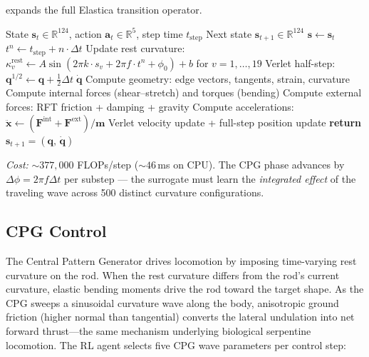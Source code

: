 \documentclass[11pt]{article}
\begin{document}
 expands the full Elastica transition operator.

\begin{algorithm}[ht!]\small
\caption{Elastica Transition Operator $T(\mathbf{s}_t,\, \mathbf{a}_t,\, t_{\text{step}}) \to \mathbf{s}_{t+1}$}\label{alg:elastica-transition}
\begin{algorithmic}[1]
\Require State $\mathbf{s}_t \in \mathbb{R}^{124}$, action $\mathbf{a}_t \in \mathbb{R}^5$, step time $t_{\text{step}}$
\Ensure Next state $\mathbf{s}_{t+1} \in \mathbb{R}^{124}$
\State $\mathbf{s} \gets \mathbf{s}_t$
  \State $t^n \gets t_{\text{step}} + n \cdot \Delta t$
  \State Update rest curvature: $\kappa_v^{\text{rest}} \gets A \sin(2\pi k \cdot s_v + 2\pi f \cdot t^n + \phi_0) + b$ for $v = 1, \ldots, 19$
  \State Verlet half-step: $\mathbf{q}^{1/2} \gets \mathbf{q} + \tfrac{1}{2}\Delta t\;\dot{\mathbf{q}}$
  \State Compute geometry: edge vectors, tangents, strain, curvature
  \State Compute internal forces (shear--stretch) and torques (bending)
  \State Compute external forces: RFT friction + damping + gravity
  \State Compute accelerations: $\ddot{\mathbf{x}} \gets (\mathbf{F}^{\text{int}} + \mathbf{F}^{\text{ext}}) / \mathbf{m}$
  \State Verlet velocity update + full-step position update
\EndFor
\State \textbf{return} $\mathbf{s}_{t+1} = (\mathbf{q},\, \dot{\mathbf{q}})$
\end{algorithmic}
\end{algorithm}

\noindent
\textit{Cost:} ${\sim}377{,}000$ FLOPs/step (${\sim}46$\,ms on CPU).
The CPG phase advances by $\Delta\phi = 2\pi f \Delta t$ per substep --- the surrogate must learn the \textit{integrated effect} of the traveling wave across 500 distinct curvature configurations.

\subsection{CPG Control}
\label{sec:system:cpg}

The Central Pattern Generator drives locomotion by imposing time-varying rest curvature on the rod.
When the rest curvature differs from the rod's current curvature, elastic bending moments drive the rod toward the target shape.
As the CPG sweeps a sinusoidal curvature wave along the body, anisotropic ground friction (higher normal than tangential) converts the lateral undulation into net forward thrust---the same mechanism underlying biological serpentine locomotion.
The RL agent selects five CPG wave parameters per control step:
\end{document}
